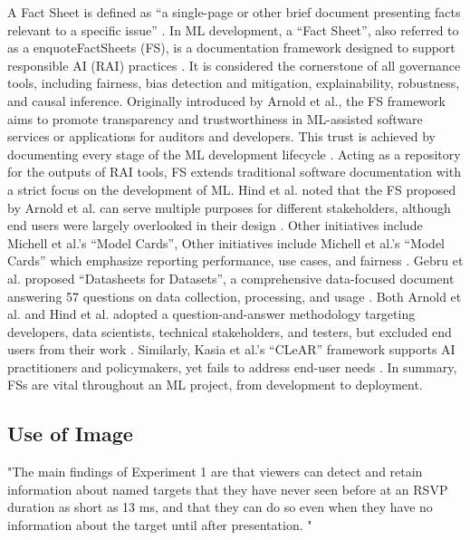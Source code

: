 \documentclass[manuscript,review,anonymous]{acmart}
\begin{document}
	A Fact Sheet is defined as \enquote{a single-page or other brief document presenting facts relevant to a specific issue} \cite{oxford_university_press_fact_nodate}. In ML development, a \enquote{Fact Sheet}, also referred to as a enquote{FactSheets} (FS), is a documentation framework designed to support responsible AI (RAI) practices \cite{arnold_factsheets_2018}. It is considered the cornerstone of all governance tools, including fairness, bias detection and mitigation, explainability, robustness, and causal inference. Originally introduced by Arnold et al., the FS framework aims to promote transparency and trustworthiness in ML-assisted software services or applications for auditors and developers. This trust is achieved by documenting every stage of the ML development lifecycle \cite{arnold_factsheets_2018}. Acting as a repository for the outputs of RAI tools, FS extends traditional software documentation with a strict focus on the development of ML. Hind et al. noted that the FS proposed by Arnold et al. can serve multiple purposes for different stakeholders, although end users were largely overlooked in their design \cite{hind_experiences_2020}. Other initiatives include Michell et al.’s “Model Cards”, Other initiatives include Michell et al.’s \enquote{Model Cards} which emphasize reporting performance, use cases, and fairness \cite{mitchell_model_2019}. Gebru et al. proposed \enquote{Datasheets for Datasets}, a comprehensive data-focused document answering 57 questions on data collection, processing, and usage \cite{gebru_datasheets_2021}. Both Arnold et al. and Hind et al. adopted a question-and-answer methodology targeting developers, data scientists, technical stakeholders, and testers, but excluded end users from their work \cite{arnold_factsheets_2018, hind_experiences_2020}. Similarly, Kasia et al.’s \enquote{CLeAR} framework supports AI practitioners and policymakers, yet fails to address end-user needs \cite{chmielinski2024the}. In summary, FSs are vital throughout an ML project, from development to deployment.

\subsection{Use of Image}

	"The main findings of Experiment 1 are that viewers	can detect and retain information about named targets that they have never seen before at an RSVP duration 	as short as 13 ms, and that they can do so even when they have no information about the target until after presentation. \cite{Potter2014}"
\end{document}
